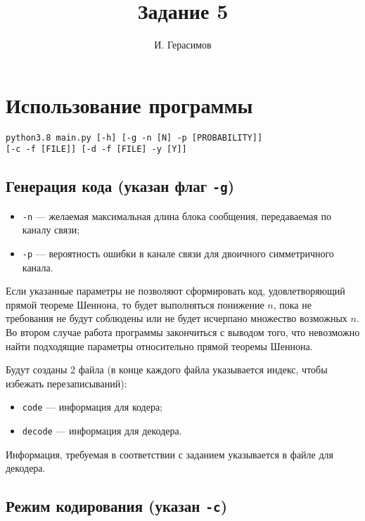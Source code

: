 \documentclass{article}
\title{Задание 5}
\author{И. Герасимов}
\date{}
\begin{document}
\maketitle

\section{Использование программы}

\begin{verbatim}
python3.8 main.py [-h] [-g -n [N] -p [PROBABILITY]]
[-c -f [FILE]] [-d -f [FILE] -y [Y]] 
\end{verbatim}

\subsection{Генерация кода (указан флаг \texttt{-g})}\label{gen}

\begin{itemize}
\item \texttt{-n} --- желаемая максимальная длина блока сообщения, передаваемая по каналу связи;
\item \texttt{-p} --- вероятность ошибки в канале связи для двоичного симметричного канала.
\end{itemize}

Если указанные параметры не позволяют сформировать код, удовлетворяющий прямой теореме Шеннона, то будет выполняться понижение $n$, пока не требования не будут соблюдены или не будет исчерпано множество возможных $n$.
Во втором случае работа программы закончиться с выводом того, что невозможно найти подходящие параметры относительно прямой теоремы Шеннона.

Будут созданы 2 файла (в конце каждого файла указывается индекс, чтобы избежать перезаписываний):

\begin{itemize}
\item \texttt{code} --- информация для кодера;
\item \texttt{decode} --- информация для декодера.
\end{itemize}

Информация, требуемая в соответствии с заданием указывается в файле для декодера.

\subsection{Режим кодирования (указан \texttt{-c})}
\end{document}
